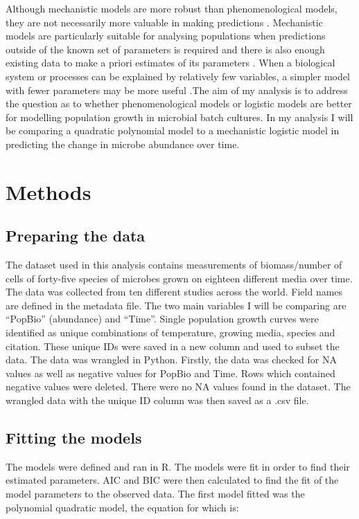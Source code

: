 \documentclass{article}[11pt]
\begin{document}
\begin{flushleft}
Although mechanistic models are more robust than phenomenological models, they are not necessarily more valuable in making predictions \cite{white2019should}. Mechanistic models are particularly suitable for analysing populations when predictions outside of the known set of parameters is required and there is also enough existing data to make a priori estimates of its parameters \cite{white2019should}. When a biological system or processes can be explained by relatively few variables, a simpler model with fewer parameters may be more useful \cite{transtrum2016bridging}.The aim of my analysis is to address the question as to whether phenomenological models or logistic models are better for modelling population growth in microbial batch cultures. In my analysis I will be comparing a quadratic polynomial model to a mechanistic logistic model in predicting the change in microbe abundance over time.

\newpage
\section{Methods}
\subsection{Preparing the data}
The dataset used in this analysis contains measurements of biomass/number of cells of forty-five species of microbes grown on eighteen different media over time. The data was collected from ten different studies across the world. Field names are defined in the metadata file. The two main variables I will be comparing are “PopBio” (abundance) and “Time”. Single population growth curves were identified as unique combinations of temperature, growing media, species and citation. These unique IDs were saved in a new column and used to subset the data. The data was wrangled in Python. Firstly, the data was checked for NA values as well as negative values for PopBio and Time. Rows which contained negative values were deleted. There were no NA values found in the dataset. The wrangled data with the unique ID column was then saved as a .csv file.
\linebreak

\subsection{Fitting the models}
The models were defined and ran in R. The models were fit in order to find their estimated parameters. AIC and BIC were then calculated to find the fit of the model parameters to the observed data. The first model fitted was the polynomial quadratic model, the equation for which is:


\end{flushleft}
\end{document}
